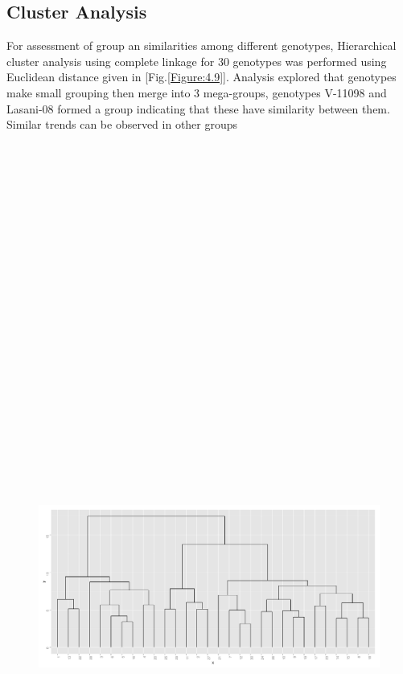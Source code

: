 \subsection{Cluster Analysis}
For assessment of group an similarities among different genotypes, Hierarchical cluster analysis using complete linkage for 30 genotypes was performed using Euclidean distance  given in [Fig.\ref{Figure:4.9}]. Analysis explored that genotypes make small grouping then merge into 3 mega-groups, genotypes V-11098 and Lasani-08 formed a group indicating that these have similarity between them. Similar trends can be observed in other groups   
\begin{figure} [H]
	\centering  
	\scalebox{0.34}
	{\includegraphics[width=20in,height=20in]{02ThesisMain/Ch04RD/figures/genotype-cluster}}

\end{figure}
